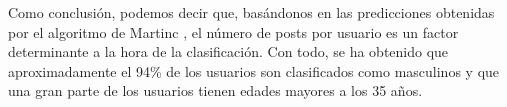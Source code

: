 \bigskip
\begin{table}[H]
	\centering
	\caption{Distribución de fama obtenida por Martinc \cite{martinc2019hot}}
	\label{tab:comparativa_fama_martinc}
\end{table}

\bigskip
Como conclusión, podemos decir que, basándonos en las predicciones obtenidas por el algoritmo de Martinc \cite{martinc2019hot}, el número de posts por usuario
es un factor determinante a la hora de la clasificación. Con todo, se ha obtenido que aproximadamente el 94\% de los usuarios son clasificados
como masculinos y que una gran parte de los usuarios tienen edades mayores a los 35 años.